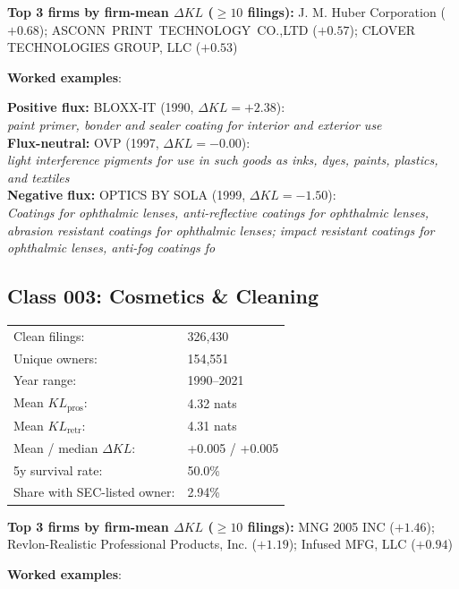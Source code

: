 \textbf{Top 3 firms by firm-mean $\Delta KL$ ($\geq 10$ filings):} J. M. Huber Corporation ($+0.68$); ASCONN PRINT TECHNOLOGY CO.,LTD ($+0.57$); CLOVER TECHNOLOGIES GROUP, LLC ($+0.53$)

\textbf{Worked examples}:

  \textbf{Positive flux:} \textsc{BLOXX-IT} (1990, $\Delta KL=+2.38$):\\
  \textit{paint primer, bonder and sealer coating for interior and exterior use}\\
  \textbf{Flux-neutral:} \textsc{OVP} (1997, $\Delta KL=-0.00$):\\
  \textit{light interference pigments for use in such goods as inks, dyes, paints, plastics, and textiles}\\
  \textbf{Negative flux:} \textsc{OPTICS BY SOLA} (1999, $\Delta KL=-1.50$):\\
  \textit{Coatings for ophthalmic lenses, anti-reflective coatings for ophthalmic lenses, abrasion resistant coatings for ophthalmic lenses; impact resistant coatings for ophthalmic lenses, anti-fog coatings fo}\\

\subsection*{Class 003: Cosmetics \& Cleaning}
\label{app:industry-003}

\begin{tabular}{ll}
Clean filings: & 326,430 \\
Unique owners: & 154,551 \\
Year range: & 1990--2021 \\
Mean $KL_\text{pros}$: & 4.32 nats \\
Mean $KL_\text{retr}$: & 4.31 nats \\
Mean / median $\Delta KL$: & +0.005 / +0.005 \\
5y survival rate: & 50.0\% \\
Share with SEC-listed owner: & 2.94\% \\
\end{tabular}

\textbf{Top 3 firms by firm-mean $\Delta KL$ ($\geq 10$ filings):} MNG 2005 INC ($+1.46$); Revlon-Realistic Professional Products, Inc. ($+1.19$); Infused MFG, LLC ($+0.94$)

\textbf{Worked examples}:

